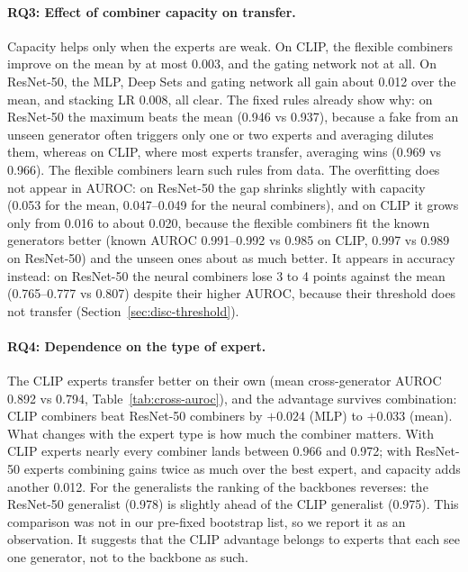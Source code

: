\documentclass[10pt,a4paper]{article}
\begin{document}
\paragraph{RQ3: Effect of combiner capacity on transfer.}
Capacity helps only when the experts are weak. On CLIP, the flexible combiners improve on the mean by at most 0.003, and the gating network not at all. On ResNet-50, the MLP, Deep Sets and gating network all gain about 0.012 over the mean, and stacking LR 0.008, all clear. The fixed rules already show why: on ResNet-50 the maximum beats the mean (0.946 vs 0.937), because a fake from an unseen generator often triggers only one or two experts and averaging dilutes them, whereas on CLIP, where most experts transfer, averaging wins (0.969 vs 0.966). The flexible combiners learn such rules from data. The overfitting does not appear in AUROC: on ResNet-50 the gap shrinks slightly with capacity (0.053 for the mean, 0.047--0.049 for the neural combiners), and on CLIP it grows only from 0.016 to about 0.020, because the flexible combiners fit the known generators better (known AUROC 0.991--0.992 vs 0.985 on CLIP, 0.997 vs 0.989 on ResNet-50) and the unseen ones about as much better. It appears in accuracy instead: on ResNet-50 the neural combiners lose 3 to 4 points against the mean (0.765--0.777 vs 0.807) despite their higher AUROC, because their threshold does not transfer (Section~\ref{sec:disc-threshold}).

\paragraph{RQ4: Dependence on the type of expert.}
The CLIP experts transfer better on their own (mean cross-generator AUROC 0.892 vs 0.794, Table~\ref{tab:cross-auroc}), and the advantage survives combination: CLIP combiners beat ResNet-50 combiners by $+0.024$ (MLP) to $+0.033$ (mean). What changes with the expert type is how much the combiner matters. With CLIP experts nearly every combiner lands between 0.966 and 0.972; with ResNet-50 experts combining gains twice as much over the best expert, and capacity adds another 0.012. For the generalists the ranking of the backbones reverses: the ResNet-50 generalist (0.978) is slightly ahead of the CLIP generalist (0.975). This comparison was not in our pre-fixed bootstrap list, so we report it as an observation. It suggests that the CLIP advantage belongs to experts that each see one generator, not to the backbone as such.
\end{document}
